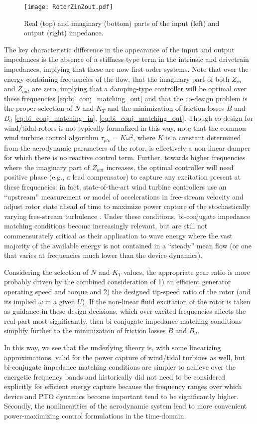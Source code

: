 \begin{figure}
	\centering \texttt{[image: RotorZinZout.pdf]}
	\caption{Real (top) and imaginary (bottom) parts of the input (left) and output (right) impedance.}
	\label{fig: RotorZinZout}
\end{figure}

The key characteristic difference in the appearance of the input and output impedances is the absence of a stiffness-type term in the intrinsic and drivetrain impedances, implying that these are now first-order systems.
Note that over the energy-containing frequencies of the flow, that the imaginary part of both $Z_{in}$ and $Z_{out}$ are zero, implying that a damping-type controller will be optimal over these frequencies \eqref{eq:bi_conj_matching_out} and that the co-design problem is the proper selection of $N$ and $K_T$ and the minimization of friction losses $B$ and $B_d$ \eqref{eq:bi_conj_matching_in}, \eqref{eq:bi_conj_matching_out}.
Though co-design for wind/tidal rotors is not typically formalized in this way, note that the common wind turbine control algorithm $\tau_{pto} = K\omega^2$, where $K$ is a constant determined from the aerodynamic parameters of the rotor, is effectively a non-linear damper for which there is no reactive control term.
Further, towards higher frequencies where the imaginary part of $Z_{out}$ increases, the optimal controller will need positive phase (e.g., a lead compensator) to capture any excitation present at these frequencies: in fact, state-of-the-art wind turbine controllers use an ``upstream'' measurement or model of accelerations in free-stream velocity and adjust rotor state ahead of time to maximize power capture of the stochastically varying free-stream turbulence \cite{Schlipf2013b}.
Under these conditions, bi-conjugate impedance matching conditions become increasingly relevant, but are still not commensurately critical as their application to wave energy where the vast majority of the available energy is not contained in a ``steady'' mean flow (or one that varies at frequencies much lower than the device dynamics).

Considering the selection of $N$ and $K_T$ values, the appropriate gear ratio is more probably driven by the combined consideration of 1) an efficient generator operating speed and torque and 2) the designed tip-speed ratio of the rotor (and its implied $\omega$ in a given $U$).
If the non-linear fluid excitation of the rotor is taken as guidance in these design decisions, which over excited frequencies affects the real part most significantly, then bi-conjugate impedance matching conditions simplify further to the minimization of friction losses $B$ and $B_d$.

In this way, we see that the underlying theory is, with some linearizing approximations, valid for the power capture of wind/tidal turbines as well, but bi-conjugate impedance matching conditions are simpler to achieve over the energetic frequency bands and historically did not need to be considered explicitly for efficient energy capture because the frequency ranges over which device and PTO dynamics become important tend to be significantly higher.
Secondly, the nonlinearities of the aerodynamic system lead to more convenient power-maximizing control formulations in the time-domain.

